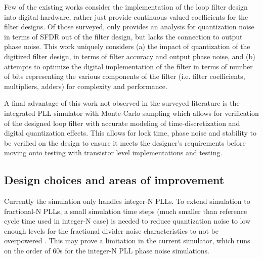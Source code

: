 Few of the existing works consider the implementation of the loop filter design into digital hardware, rather just provide continuous valued coefficients for the filter designs. Of those surveyed, only \cite{kumm_klingbeil_zipf_2010} provides an analysis for quantization noise in terms of SFDR out of the filter design, but lacks the connection to output phase noise. This work uniquely considers (a) the impact of quantization of the digitized filter design, in terms of filter accuracy and output phase noise, and (b) attempts to optimize the digital implementation of the filter in terms of number of bits representing the various components of the filter (i.e. filter coefficients, multipliers, adders) for complexity and performance.

A final advantage of this work not observed in the surveyed literature is the integrated PLL simulator with Monte-Carlo sampling which allows for verification of the designed loop filter with accurate modeling of time-discretization and digital quantization effects. This allows for lock time, phase noise and stability to be verified on the design to ensure it meets the designer's requirements before moving onto testing with transistor level implementations and testing.



\subsection{Design choices and areas of improvement}

Currently the simulation only handles integer-N PLLs. To extend simulation to fractional-N PLLs, a small simulation time steps (much smaller than reference cycle time used in integer-N case) is needed to reduce quantization noise to low enough levels for the fractional divider noise characteristics to not be overpowered \cite{perrott_2002_sim}. This may prove a limitation in the current simulator, which runs on the order of 60s for the integer-N PLL phase noise simulations.



